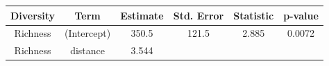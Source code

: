 \documentclass[]{article}
\begin{document}
\begin{longtable}[]{@{}cccccc@{}}
\toprule
\begin{minipage}[b]{0.12\columnwidth}\centering\strut
Diversity\strut
\end{minipage} & \begin{minipage}[b]{0.24\columnwidth}\centering\strut
Term\strut
\end{minipage} & \begin{minipage}[b]{0.11\columnwidth}\centering\strut
Estimate\strut
\end{minipage} & \begin{minipage}[b]{0.14\columnwidth}\centering\strut
Std. Error\strut
\end{minipage} & \begin{minipage}[b]{0.12\columnwidth}\centering\strut
Statistic\strut
\end{minipage} & \begin{minipage}[b]{0.09\columnwidth}\centering\strut
p-value\strut
\end{minipage}\tabularnewline
\midrule
\endhead
\begin{minipage}[t]{0.12\columnwidth}\centering\strut
Richness\strut
\end{minipage} & \begin{minipage}[t]{0.24\columnwidth}\centering\strut
(Intercept)\strut
\end{minipage} & \begin{minipage}[t]{0.11\columnwidth}\centering\strut
350.5\strut
\end{minipage} & \begin{minipage}[t]{0.14\columnwidth}\centering\strut
121.5\strut
\end{minipage} & \begin{minipage}[t]{0.12\columnwidth}\centering\strut
2.885\strut
\end{minipage} & \begin{minipage}[t]{0.09\columnwidth}\centering\strut
0.0072\strut
\end{minipage}\tabularnewline
\begin{minipage}[t]{0.12\columnwidth}\centering\strut
Richness\strut
\end{minipage} & \begin{minipage}[t]{0.24\columnwidth}\centering\strut
distance\strut
\end{minipage} & \begin{minipage}[t]{0.11\columnwidth}\centering\strut
3.544\strut
\end{minipage} & \begin{minipage}[t]{0.14\columnwidth}\centering\strut

\end{minipage}
\end{longtable}
\end{document}
